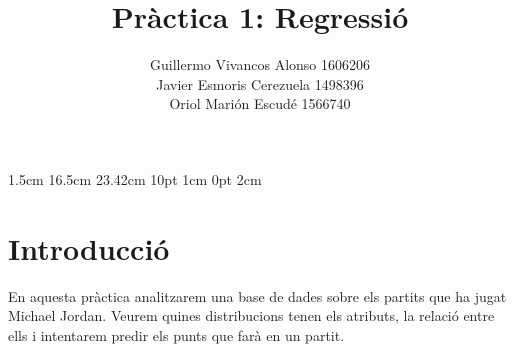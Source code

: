 \documentclass{article}
\title{Pràctica 1: Regressió}
\author{Guillermo Vivancos Alonso 1606206\\
	Javier Esmoris Cerezuela 1498396\\
	Oriol Marión Escudé 1566740}
\begin{document}
\date{}
\setmargins{2.5cm}       %
{1.5cm}                        %
{16.5cm}                      %
{23.42cm}                    %
{10pt}                           %
{1cm}                           %
{0pt}                             %
{2cm}                           %

\pagestyle{fancy}
\fancyhf{}
\rfoot{\thepage}
\maketitle
\noindent
\section*{Introducció}
En aquesta pràctica analitzarem una base de dades sobre els partits que ha jugat Michael Jordan. Veurem quines distribucions tenen els atributs, la relació entre ells i intentarem predir els punts que farà en un partit.
\end{document}
